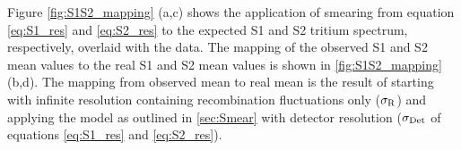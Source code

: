 
Figure \ref{fig:S1S2_mapping} (a,c) shows the application of smearing from equation \ref{eq:S1_res} and \ref{eq:S2_res} to the expected S1 and S2 tritium spectrum, respectively, overlaid with the data. The mapping of the observed S1 and S2 mean values to the real S1 and S2 mean values is shown in \ref{fig:S1S2_mapping} (b,d). The mapping from observed mean to real mean is the result of starting with infinite resolution containing recombination fluctuations only ($\rm \sigma_R$) and applying the model as outlined in \ref{sec:Smear} with detector resolution ($\rm \sigma_{Det}$ of equations \ref{eq:S1_res} and \ref{eq:S2_res}). 

